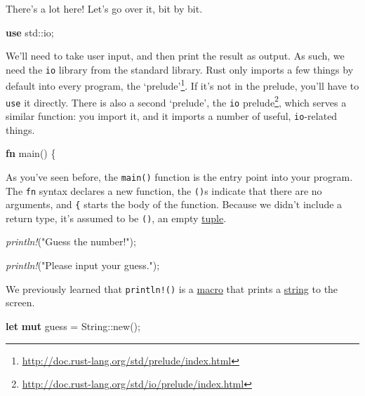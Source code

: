 \documentclass[a4paper,]{book}
\newenvironment{Shaded}{\begin{snugshade}}{\end{snugshade}}
\newcommand{\KeywordTok}[1]{\textcolor[rgb]{0.13,0.29,0.53}{\textbf{{#1}}}}
\newcommand{\DataTypeTok}[1]{\textcolor[rgb]{0.13,0.29,0.53}{{#1}}}
\newcommand{\StringTok}[1]{\textcolor[rgb]{0.31,0.60,0.02}{{#1}}}
\newcommand{\PreprocessorTok}[1]{\textcolor[rgb]{0.56,0.35,0.01}{\textit{{#1}}}}
\newcommand{\NormalTok}[1]{{#1}}
\renewcommand{\href}[2]{#2\footnote{\url{#1}}}
\begin{document}
There's a lot here! Let's go over it, bit by bit.

\begin{Shaded}
\begin{Highlighting}[]
\KeywordTok{use} \NormalTok{std::io;}
\end{Highlighting}
\end{Shaded}

We'll need to take user input, and then print the result as output. As
such, we need the \texttt{io} library from the standard library. Rust
only imports a few things by default into every program,
\href{http://doc.rust-lang.org/std/prelude/index.html}{the `prelude'}.
If it's not in the prelude, you'll have to \texttt{use} it directly.
There is also a second `prelude', the
\href{http://doc.rust-lang.org/std/io/prelude/index.html}{\texttt{io}
prelude}, which serves a similar function: you import it, and it imports
a number of useful, \texttt{io}-related things.

\begin{Shaded}
\begin{Highlighting}[]
\KeywordTok{fn} \NormalTok{main() \{}
\end{Highlighting}
\end{Shaded}

As you've seen before, the \texttt{main()} function is the entry point
into your program. The \texttt{fn} syntax declares a new function, the
\texttt{()}s indicate that there are no arguments, and \texttt{\{}
starts the body of the function. Because we didn't include a return
type, it's assumed to be \texttt{()}, an empty
\protect\hyperlink{tuples}{tuple}.

\begin{Shaded}
\begin{Highlighting}[]
    \PreprocessorTok{println!}\NormalTok{(}\StringTok{"Guess the number!"}\NormalTok{);}

    \PreprocessorTok{println!}\NormalTok{(}\StringTok{"Please input your guess."}\NormalTok{);}
\end{Highlighting}
\end{Shaded}

We previously learned that \texttt{println!()} is a
\protect\hyperlink{sec--macros}{macro} that prints a
\protect\hyperlink{sec--strings}{string} to the screen.

\begin{Shaded}
\begin{Highlighting}[]
    \KeywordTok{let} \KeywordTok{mut} \NormalTok{guess = }\DataTypeTok{String}\NormalTok{::new();}
\end{Highlighting}
\end{Shaded}
\end{document}
